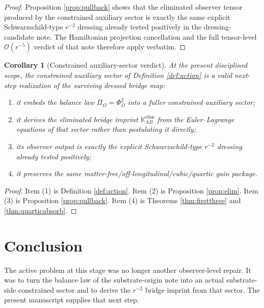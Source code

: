 \documentclass[11pt]{article}
\newcommand{\FlowPot}{\Phi_\Omega}
\newcommand{\BalanceField}{\Pi_\Omega}
\newcommand{\AuxPol}{\mathbb K}
\newtheorem{corollary}{Corollary}
\begin{document}
\begin{proof}
Proposition \ref{prop:pullback} shows that the eliminated observer tensor produced by the constrained auxiliary sector is exactly the same explicit Schwarzschild-type \(r^{-2}\) dressing already tested positively in the dressing-candidate note. The Hamiltonian projection cancellation and the full tensor-level \(\mathcal O(r^{-5})\) verdict of that note therefore apply verbatim.
\end{proof}

\begin{corollary}[Constrained auxiliary-sector verdict]
\label{cor:verdict}
At the present disciplined scope, the constrained auxiliary sector of Definition \ref{def:action} is a valid next-step realization of the surviving dressed bridge map:
\begin{enumerate}
    \item it embeds the balance law \(\BalanceField=\FlowPot^2\) into a fuller constrained auxiliary sector;
    \item it derives the eliminated bridge imprint \(\AuxPol^{\mathrm{elim}}_{AB}\) from the Euler--Lagrange equations of that sector rather than postulating it directly;
    \item its observer output is exactly the explicit Schwarzschild-type \(r^{-2}\) dressing already tested positively;
    \item it preserves the same matter-free/off-longitudinal/cubic/quartic gain package.
\end{enumerate}
\end{corollary}

\begin{proof}
Item (1) is Definition \ref{def:action}. Item (2) is Proposition \ref{prop:elim}. Item (3) is Proposition \ref{prop:pullback}. Item (4) is Theorems \ref{thm:firstthree} and \ref{thm:quarticabsorb}.
\end{proof}

\section{Conclusion}

The active problem at this stage was no longer another observer-level repair. It was to turn the balance law of the substrate-origin note into an actual substrate-side constrained sector and to derive the \(r^{-2}\) bridge imprint from that sector. The present manuscript supplies that next step.
\end{document}
